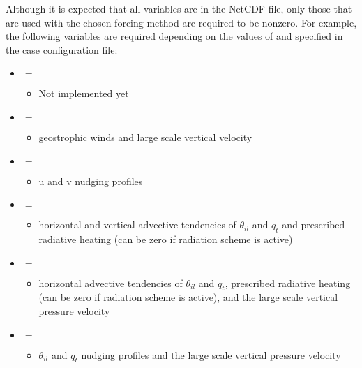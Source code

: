 Although it is expected that all variables are in the NetCDF file, only those that are used with the chosen forcing method are required to be nonzero. For example, the following variables are required depending on the values of  and  specified in the case configuration file:

\begin{itemize}
\item {} $=$ 
	\begin{itemize}
		\item Not implemented yet
	\end{itemize}
\item {} $=$ 
	\begin{itemize}
		\item geostrophic winds and large scale vertical velocity
	\end{itemize}
\item {} $=$ 
	\begin{itemize}
		\item u and v nudging profiles
	\end{itemize}
\item {} $=$ 
	\begin{itemize}
		\item horizontal and vertical advective tendencies of $\theta_{il}$ and $q_t$ and prescribed radiative heating (can be zero if radiation scheme is active)
	\end{itemize}
\item {} $=$ 
	\begin{itemize}
		\item horizontal advective tendencies of $\theta_{il}$ and $q_t$, prescribed radiative heating (can be zero if radiation scheme is active), and the large scale vertical pressure velocity
	\end{itemize}
\item {} $=$ 
	\begin{itemize}
		\item $\theta_{il}$ and $q_t$ nudging profiles and the large scale vertical pressure velocity
	\end{itemize}
\end{itemize}

